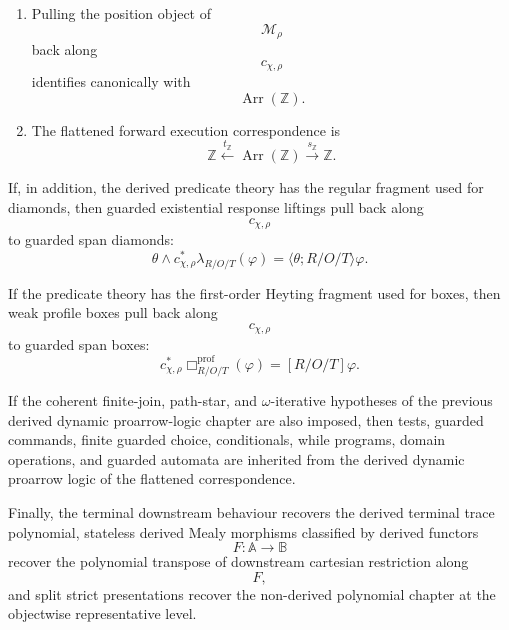 \begin{theorem}
\begin{enumerate}
\item Pulling the position object of
\[
\mathcal M_\rho
\]
back along
\[
c_{\chi,\rho}
\]
identifies canonically with
\[
\operatorname{Arr}(\mathbb Z).
\]

\item The flattened forward execution correspondence is
\[
\mathbb Z
\xleftarrow{t_{\mathbb Z}}
\operatorname{Arr}(\mathbb Z)
\xrightarrow{s_{\mathbb Z}}
\mathbb Z.
\]
\end{enumerate}

If, in addition, the derived predicate theory has the regular fragment used
for diamonds, then guarded existential response liftings pull back along
\[
c_{\chi,\rho}
\]
to guarded span diamonds:
\[
\theta
\wedge
c_{\chi,\rho}^{\ast}\lambda_{R/O/T}(\varphi)
=
\langle\theta;R/O/T\rangle\varphi.
\]

If the predicate theory has the first-order Heyting fragment used for boxes,
then weak profile boxes pull back along
\[
c_{\chi,\rho}
\]
to guarded span boxes:
\[
c_{\chi,\rho}^{\ast}
\Box^{\mathrm{prof}}_{R/O/T}(\varphi)
=
[R/O/T]\varphi.
\]

If the coherent finite-join, path-star, and \(\omega\)-iterative hypotheses of
the previous derived dynamic proarrow-logic chapter are also imposed, then
tests, guarded commands, finite guarded choice, conditionals, while programs,
domain operations, and guarded automata are inherited from the derived dynamic
proarrow logic of the flattened correspondence.

Finally, the terminal downstream behaviour recovers the derived terminal trace
polynomial, stateless derived Mealy morphisms classified by derived functors
\[
F:\mathbb A\to\mathbb B
\]
recover the polynomial transpose of downstream cartesian restriction along
\[
F,
\]
and split strict presentations recover the non-derived polynomial chapter at
the objectwise representative level.
\end{theorem}

